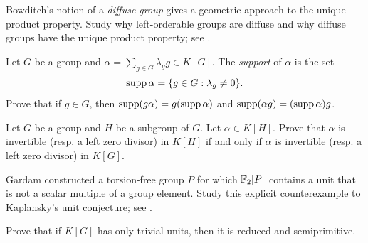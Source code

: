 \smallskip 
\project
Bowditch's notion of a \emph{diffuse group} gives a geometric approach
to the unique product property. Study why left-orderable groups
are diffuse and why diffuse groups have the unique product
property; see \cite[Section~2]{MR3548136}.

\begin{exercise}
	Let $G$ be a group and $\alpha=\sum_{g\in G}\lambda_gg\in K[G]$.  
	The \emph{support} of $\alpha$ is the set 
	\[
		\operatorname{supp}\alpha=\{g\in G:\lambda_g\ne 0\}.
	\]
	Prove that if $g\in G$, then 
	$\operatorname{supp}(g\alpha)=g(\operatorname{supp}\alpha)$ and $\operatorname{supp}(\alpha g)=(\operatorname{supp}\alpha)g$.
\end{exercise}

\begin{exercise}
\label{xca:invertible_subgroups}
	Let $G$ be a group and $H$ be a subgroup of $G$. Let $\alpha\in K[H]$. Prove that 
    $\alpha$ is invertible (resp. a left zero divisor) in $K[H]$ if and only if 
	$\alpha$ is invertible (resp. a left zero divisor) in
	$K[G]$.
\end{exercise}

\project
Gardam constructed a torsion-free group $P$ for which
$\mathbb{F}_2[P]$ contains a unit that is not a scalar multiple
of a group element. Study this explicit counterexample
to Kaplansky's unit conjecture; see \cite{MR4334981}.

\begin{bonus}
\label{bonus:reduced+semiprimitive}
	Prove that if $K[G]$ has only trivial units, then it is
	reduced and semiprimitive.
\end{bonus}



